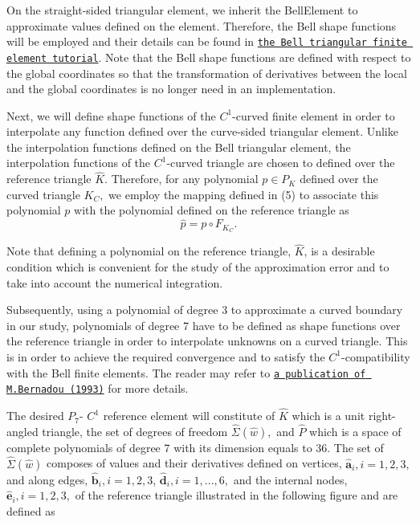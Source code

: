 On the straight-\/sided triangular element, we inherit the {\ttfamily Bell\+Element} to approximate values defined on the element. Therefore, the Bell shape functions will be employed and their details can be found in \href{../../../c1_element/bell_element/html/index.html}{\tt the Bell triangular finite element tutorial}. Note that the Bell shape functions are defined with respect to the global coordinates so that the transformation of derivatives between the local and the global coordinates is no longer need in an implementation.

Next, we will define shape functions of the $ C^1 $-\/curved finite element in order to interpolate any function defined over the curve-\/sided triangular element. Unlike the interpolation functions defined on the Bell triangular element, the interpolation functions of the $ C^1 $-\/curved triangle are chosen to defined over the reference triangle $ \hat{K}. $ Therefore, for any polynomial $p \in P_{K}$ defined over the curved triangle $ K_{C}, $ we employ the mapping defined in (5) to associate this polynomial $ p $ with the polynomial defined on the reference triangle as \[ \hat{p} = p \circ F_{K_C}. \]

Note that defining a polynomial on the reference triangle, $\hat{K}$, is a desirable condition which is convenient for the study of the approximation error and to take into account the numerical integration.

Subsequently, using a polynomial of degree 3 to approximate a curved boundary in our study, polynomials of degree 7 have to be defined as shape functions over the reference triangle in order to interpolate unknowns on a curved triangle. This is in order to achieve the required convergence and to satisfy the $ C^1 $-\/compatibility with the Bell finite elements. The reader may refer to \href{http://www.sciencedirect.com/science?_ob=MiamiImageURL&_cid=271868&_user=6991156&_pii=004578259390111A&_check=y&_origin=article&_zone=toolbar&_coverDate=31-Jan-1993&view=c&originContentFamily=serial&wchp=dGLzVlV-zSkzk&md5=d038a1aec18c25806e39c26187c2a200&pid=1-s2.0-004578259390111A-main.pdf}{\tt a publication of M.\+Bernadou (1993)} for more details.

The desired $P_{7}$-\/ $C^1$ reference element will constitute of $\hat{K}$ which is a unit right-\/angled triangle, the set of degrees of freedom $ \hat{\Sigma}(\hat{w}),$ and $\hat{P}$ which is a space of complete polynomials of degree 7 with its dimension equals to 36. The set of $ \hat{\Sigma}(\hat{w}) $ composes of values and their derivatives defined on vertices, $ \mathbf{\hat{a}}_i, i=1,2,3, $ and along edges, $ \mathbf{\hat{b}}_i, i=1,2,3 $, $ \mathbf{\hat{d}}_i, i = 1,...,6, $ and the internal nodes, $ \mathbf{\hat{e}}_i, i=1,2,3, $ of the reference triangle illustrated in the following figure and are defined as

